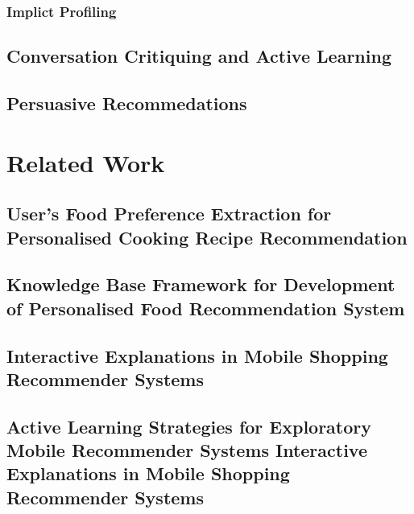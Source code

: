 \subsubsection{Implict Profiling}

\subsection{Conversation Critiquing and Active Learning}

\subsection{Persuasive Recommedations}

\section{Related Work}

\subsection{User's Food Preference Extraction for Personalised Cooking Recipe Recommendation}

\subsection{Knowledge Base Framework for Development of Personalised Food Recommendation System}

\subsection{Interactive Explanations in Mobile Shopping Recommender Systems}

\subsection{Active Learning Strategies for Exploratory Mobile Recommender Systems Interactive Explanations in Mobile Shopping Recommender Systems}